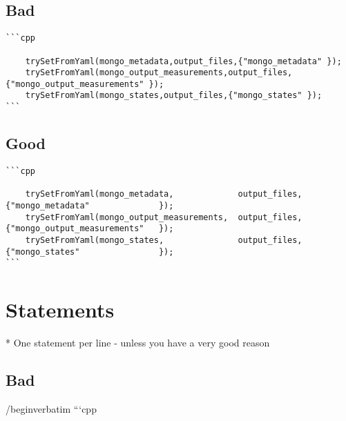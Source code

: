 
\subsection{Bad}

\begin{verbatim}
```cpp

    trySetFromYaml(mongo_metadata,output_files,{"mongo_metadata" });
    trySetFromYaml(mongo_output_measurements,output_files,{"mongo_output_measurements" });
    trySetFromYaml(mongo_states,output_files,{"mongo_states" });
```
\end{verbatim}

\subsection{Good}
\begin{verbatim}
```cpp

    trySetFromYaml(mongo_metadata,             output_files, {"mongo_metadata"              });
    trySetFromYaml(mongo_output_measurements,  output_files, {"mongo_output_measurements"	});
    trySetFromYaml(mongo_states,               output_files, {"mongo_states"		        });
```
\end{verbatim}

\section{Statements}

* One statement per line  - \*unless you have a very good reason

\subsection{Bad}
/begin{verbatim}
```cpp

